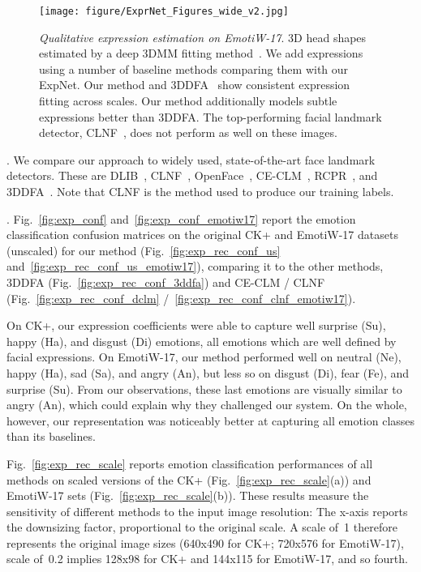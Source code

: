 \documentclass[a4paper, 10pt, conference]{ieeeconf}
\newcommand{\minisection}[1]{\vspace{2mm}\noindent{\bf #1}.}
\begin{document}
\begin{figure*}[tb]
\centering
\texttt{[image: figure/ExprNet\_Figures\_wide\_v2.jpg]}
\caption{
{\em Qualitative expression estimation on EmotiW-17}. 3D head shapes estimated by a deep 3DMM fitting method~\cite{tran16_3dmm_cnn}. We add expressions using a number of baseline methods comparing them with our ExpNet. Our method and 3DDFA~\cite{zhu2015} show consistent expression fitting across scales. Our method additionally models subtle expressions better than 3DDFA. The top-performing facial landmark detector, CLNF~\cite{baltrusaitis2013constrained}, does not perform as well on these images.}
\label{fig:qual_emotiw17}
\vspace{-3mm}
\end{figure*}



\minisection{Baseline methods} We compare our approach to widely used, state-of-the-art face landmark detectors. These are DLIB~\cite{king2009dlib}, CLNF~\cite{baltrusaitis2013constrained}, OpenFace~\cite{baltruvsaitis2016openface}, CE-CLM~\cite{zadeh2016deep}, RCPR~\cite{burgos2013robust}, and 3DDFA~\cite{zhu2015}. Note that CLNF is the method used to produce our training labels.

\minisection{Results} Fig.~\ref{fig:exp_conf} and~\ref{fig:exp_conf_emotiw17} report the emotion classification confusion matrices on the original CK+ and EmotiW-17 datasets (unscaled) for our method (Fig.~\ref{fig:exp_rec_conf_us} and~\ref{fig:exp_rec_conf_us_emotiw17}), comparing it to the other methods, 3DDFA (Fig.~\ref{fig:exp_rec_conf_3ddfa}) and CE-CLM / CLNF (Fig.~\ref{fig:exp_rec_conf_dclm} /~\ref{fig:exp_rec_conf_clnf_emotiw17}).

On CK+, our expression coefficients were able to capture well surprise (Su), happy (Ha), and disgust (Di) emotions, all emotions which are well defined by facial expressions. On EmotiW-17, our method performed well on neutral (Ne), happy (Ha), sad (Sa), and angry (An), but less so on disgust (Di), fear (Fe), and surprise (Su). From our observations, these last emotions are visually similar to angry (An), which could explain why they challenged our system. On the whole, however, our representation was noticeably better at capturing all emotion classes than its baselines.


Fig.~\ref{fig:exp_rec_scale} reports emotion classification performances of all methods on scaled versions of the CK+ (Fig.~\ref{fig:exp_rec_scale}(a)) and EmotiW-17 sets (Fig.~\ref{fig:exp_rec_scale}(b)). These results measure the sensitivity of different methods to the input image resolution: The x-axis reports the downsizing factor, proportional to the original scale. A scale of~1 therefore represents the original image sizes (640x490 for CK+; 720x576 for EmotiW-17), scale of~0.2 implies 128x98 for CK+ and 144x115 for EmotiW-17, and so fourth.
\end{document}
